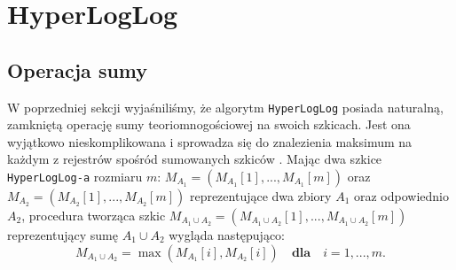 \section{HyperLogLog}

\subsection{Operacja sumy}

W poprzedniej sekcji wyjaśniliśmy, że algorytm \texttt{HyperLogLog} posiada naturalną, zamkniętą operację sumy teoriomnogościowej na swoich szkicach. Jest ona wyjątkowo nieskomplikowana i sprowadza się do znalezienia maksimum na każdym z rejestrów spośród sumowanych szkiców \cite{oertl}. Mając dwa szkice \texttt{HyperLogLog-a} rozmiaru $m$: $M_{A_1} = (M_{A_1}[1], ..., M_{A_1}[m])$ oraz $M_{A_2} = (M_{A_2}[1], ..., M_{A_2}[m])$ reprezentujące dwa zbiory $A_1$ oraz odpowiednio $A_2$, procedura tworząca szkic $M_{A_1 \cup A_2} = (M_{A_1 \cup A_2}[1], ..., M_{A_1 \cup A_2}[m])$ reprezentujący sumę $A_1 \cup A_2$ wygląda następująco:
\begin{equation}
    M_{A_1 \cup A_2} = \max(M_{A_1}[i], M_{A_2}[i]) \quad \textbf{dla} \quad i = 1, ..., m.
\end{equation}

